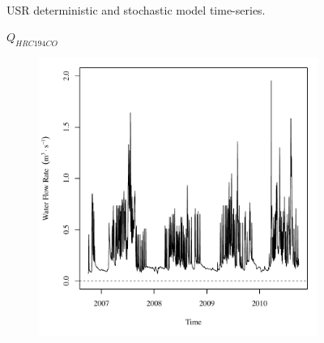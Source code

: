 \begin{linenumbers}
\begin{landscape}
\begin{figure}
\begin{subfigure}{0.7\textwidth}
		\end{subfigure}\\
		\caption{USR deterministic and stochastic model time-series.}
	\end{figure}
\end{landscape}
\subfiguremid
\begin{landscape}
	\begin{figure}
		\centering
		$ Q_{HRC194CO} $
		\begin{subfigure}{0.7\textwidth}
			\centering
			\includegraphics[width=\textwidth]{"Figures/Results_USR/Deterministic/Q HRC"}
		\end{subfigure}%
		\begin{subfigure}{0.7\textwidth}
			\centering

\end{subfigure}
\end{figure}
\end{landscape}
\end{linenumbers}
